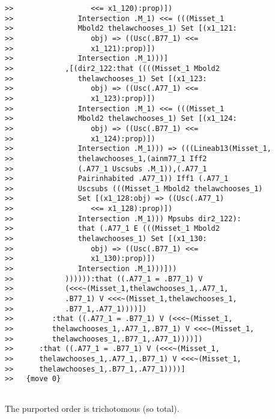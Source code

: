\documentclass[12pt]{article}
\begin{document}
\begin{verbatim}
>>                  <<= x1_120):prop)])
>>               Intersection .M_1) <<= (((Misset_1
>>               Mbold2 thelawchooses_1) Set [(x1_121:
>>                  obj) => ((Usc(.B77_1) <<=
>>                  x1_121):prop)])
>>               Intersection .M_1)))]
>>            ,[(dir2_122:that ((((Misset_1 Mbold2
>>               thelawchooses_1) Set [(x1_123:
>>                  obj) => ((Usc(.A77_1) <<=
>>                  x1_123):prop)])
>>               Intersection .M_1) <<= (((Misset_1
>>               Mbold2 thelawchooses_1) Set [(x1_124:
>>                  obj) => ((Usc(.B77_1) <<=
>>                  x1_124):prop)])
>>               Intersection .M_1))) => (((Lineab13(Misset_1,
>>               thelawchooses_1,(ainm77_1 Iff2
>>               (.A77_1 Uscsubs .M_1)),(.A77_1
>>               Pairinhabited .A77_1)) Iff1 (.A77_1
>>               Uscsubs (((Misset_1 Mbold2 thelawchooses_1)
>>               Set [(x1_128:obj) => ((Usc(.A77_1)
>>                  <<= x1_128):prop)])
>>               Intersection .M_1))) Mpsubs dir2_122):
>>               that (.A77_1 E (((Misset_1 Mbold2
>>               thelawchooses_1) Set [(x1_130:
>>                  obj) => ((Usc(.B77_1) <<=
>>                  x1_130):prop)])
>>               Intersection .M_1)))]))
>>            )))))):that ((.A77_1 = .B77_1) V
>>            (<<<~(Misset_1,thelawchooses_1,.A77_1,
>>            .B77_1) V <<<~(Misset_1,thelawchooses_1,
>>            .B77_1,.A77_1))))])
>>         :that ((.A77_1 = .B77_1) V (<<<~(Misset_1,
>>         thelawchooses_1,.A77_1,.B77_1) V <<<~(Misset_1,
>>         thelawchooses_1,.B77_1,.A77_1))))])
>>      :that ((.A77_1 = .B77_1) V (<<<~(Misset_1,
>>      thelawchooses_1,.A77_1,.B77_1) V <<<~(Misset_1,
>>      thelawchooses_1,.B77_1,.A77_1))))]
>>   {move 0}


\end{verbatim}

The purported order is trichotomous (so total).
\end{document}
